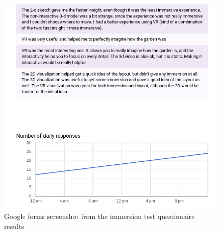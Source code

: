 \begin{multicols}{2}
\begin{figure}[H]
		\includegraphics[width=1.0\linewidth]{include/Appendices/immersionQuestionnaire/8.png}
		\caption{Google forms screenshot from the immersion test questionaire results}
	\end{figure}
\end{multicols}

